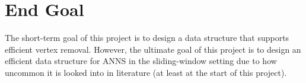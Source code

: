 \section{End Goal}

The short-term goal of this project is to design a data structure that supports efficient vertex removal. However, the ultimate goal of this project is to design an efficient data structure for ANNS in the sliding-window setting due to how uncommon it is looked into in literature (at least at the start of this project).

